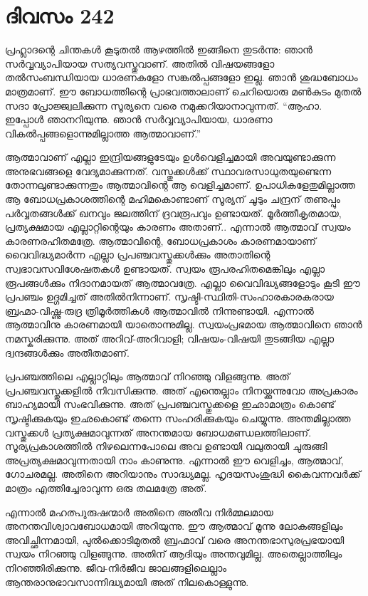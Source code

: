 \section{ദിവസം 242}


പ്രഹ്ലാദന്റെ ചിന്തകള്‍ കൂടുതല്‍ ആഴത്തില്‍ ഇങ്ങിനെ തുടര്‍ന്നു: ഞാന്‍ സര്‍വ്വവ്യാപിയായ സത്യവസ്തുവാണ്. അതില്‍ വിഷയങ്ങളോ തല്‍സംബന്ധിയായ ധാരണകളോ സങ്കല്‍പ്പങ്ങളോ ഇല്ല. ഞാന്‍ ശുദ്ധബോധം മാത്രമാണ്. ഈ ബോധത്തിന്റെ പ്രാഭവത്താലാണ് ചെറിയൊരു മണ്‍കുടം മുതല്‍ സദാ പ്രോജ്ജ്വലിക്കുന്ന സൂര്യനെ വരെ നമുക്കറിയാനാവുന്നത്. “ആഹാ. ഇപ്പോള്‍ ഞാനറിയുന്നു. ഞാന്‍ സര്‍വ്വവ്യാപിയായ, ധാരണാ വികല്‍പ്പങ്ങളൊന്നുമില്ലാത്ത ആത്മാവാണ്.”
 
ആത്മാവാണ് എല്ലാ ഇന്ദ്രിയങ്ങളുടേയും ഉള്‍വെളിച്ചമായി അവയുണ്ടാക്കുന്ന അനുഭവങ്ങളെ വേദ്യമാക്കുന്നത്. വസ്തുക്കള്‍ക്ക് സ്ഥാവരസാധുതയുണ്ടെന്ന തോന്നലുണ്ടാക്കുന്നതും ആത്മാവിന്റെ ആ വെളിച്ചമാണ്. ഉപാധികളേതുമില്ലാത്ത ആ ബോധപ്രകാശത്തിന്റെ മഹിമകൊണ്ടാണ് സൂര്യന് ചൂടും ചന്ദ്രന് തണുപ്പും പര്‍വ്വതങ്ങള്‍ക്ക് ഖനവും ജലത്തിന് ദ്രവരൂപവും  ഉണ്ടായത്. മൂര്‍ത്തീകൃതമായ, പ്രത്യക്ഷമായ എല്ലാറ്റിന്റെയും കാരണം അതാണ്‌.. എന്നാല്‍ ആത്മാവ് സ്വയം കാരണരഹിതമത്രേ. ആത്മാവിന്റെ, ബോധപ്രകാശം കാരണമായാണ് വൈവിദ്ധ്യമാര്‍ന്ന എല്ലാ പ്രപഞ്ചവസ്തുക്കള്‍ക്കും അതാതിന്റെ  സ്വഭാവസവിശേഷതകള്‍ ഉണ്ടായത്. സ്വയം രൂപരഹിതമെങ്കിലും എല്ലാ രൂപങ്ങള്‍ക്കും നിദാനമായത് ആത്മാവത്രേ. എല്ലാ വൈവിദ്ധ്യങ്ങളോടും കൂടി ഈ പ്രപഞ്ചം ഉദ്ഗമിച്ചത് അതില്‍നിന്നാണ്. സൃഷ്ടി-സ്ഥിതി-സംഹാരകാരകരായ  ബ്രഹ്മാ-വിഷ്ണു-രുദ്ര ത്രിമൂര്‍ത്തികള്‍ ആത്മാവില്‍ നിന്നുണ്ടായി. എന്നാല്‍ ആത്മാവിനു കാരണമായി യാതൊന്നുമില്ല. സ്വയംപ്രഭമായ ആത്മാവിനെ ഞാന്‍ നമസ്കരിക്കുന്നു. അത് അറിവ്-അറിവാളി; വിഷയം-വിഷയി തുടങ്ങിയ എല്ലാ ദ്വന്ദങ്ങള്‍ക്കും അതീതമാണ്.

പ്രപഞ്ചത്തിലെ എല്ലാറ്റിലും ആത്മാവ് നിറഞ്ഞു വിളങ്ങുന്നു. അത് പ്രപഞ്ചവസ്തുക്കളില്‍ നിവസിക്കുന്നു. അത് എന്തെല്ലാം നിനയ്ക്കുന്നുവോ അപ്രകാരം ബാഹ്യമായി സംഭവിക്കുന്നു. അത് പ്രപഞ്ചവസ്തുക്കളെ ഇഛാമാത്രം കൊണ്ട് സൃഷ്ടിക്കുകയും ഇഛകൊണ്ട് തന്നെ സംഹരിക്കുകയും ചെയ്യുന്നു. അന്തമില്ലാത്ത വസ്തുക്കള്‍ പ്രത്യക്ഷമാവുന്നത് അനന്തമായ ബോധമണ്ഡലത്തിലാണ്. സൂര്യപ്രകാശത്തില്‍ നിഴലെന്നപോലെ അവ ഉണ്ടായി വലുതായി ചുരുങ്ങി അപ്രത്യക്ഷമാവുന്നതായി നാം കാണുന്നു. എന്നാല്‍ ഈ വെളിച്ചം, ആത്മാവ്, ഗോചരമല്ല. അതിനെ അറിയാനും സാദ്ധ്യമല്ല.  ഹൃദയസംശുദ്ധി കൈവന്നവര്‍ക്ക് മാത്രം എത്തിച്ചേരാവുന്ന ഒരു തലമത്രേ അത്. 
    
എന്നാല്‍ മഹത്പുരുഷന്മാര്‍ അതിനെ അതീവ നിര്‍മ്മലമായ അനന്തവിശ്വാവബോധമായി അറിയുന്നു. ഈ ആത്മാവ് മൂന്നു ലോകങ്ങളിലും അവിച്ഛിന്നമായി, പുല്‍ക്കൊടിമുതല്‍ ബ്രഹ്മാവ്‌ വരെ അനന്തഭാസുരപ്രഭയായി സ്വയം നിറഞ്ഞു വിളങ്ങുന്നു.  അതിന് ആദിയും അന്തവുമില്ല. അതെല്ലാത്തിലും നിറഞ്ഞിരിക്കുന്നു. ജീവ-നിര്‍ജീവ ജാലങ്ങളിലെല്ലാം ആന്തരാനുഭാവസാന്നിദ്ധ്യമായി അത് നിലകൊള്ളുന്നു. 
